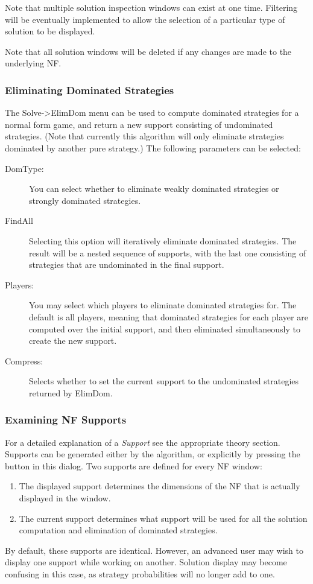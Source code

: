 Note that multiple solution inspection windows can exist at one time.  Filtering will
be eventually implemented to allow the selection of a particular type of solution to
be displayed.

Note that all solution windows will be deleted if any changes are 
made to the underlying NF.



\subsubsection{Eliminating Dominated Strategies}\label{ElimDom}
The Solve->ElimDom menu can be used to compute dominated 
strategies for a normal form game, and return a new support 
consisting of undominated strategies.  
(Note that currently this algorithm will only eliminate 
strategies dominated by another pure strategy.)  The following parameters can 
be selected:
\begin{description}
\item[DomType:]  You can select whether to eliminate weakly dominated 
strategies or strongly dominated strategies.
\item[FindAll] Selecting this option will iteratively eliminate dominated strategies. The 
result will be a nested sequence of supports, with the last one consisting of 
strategies that are undominated in the final support.  
\item[Players:] You may select which players to eliminate dominated strategies for. The 
default is all players, meaning that dominated strategies for each player are computed 
over the initial support, and then eliminated simultaneously to create the new support.  
\item[Compress:] Selects whether to set the current support to the undominated 
strategies returned by ElimDom.  
\end{description}

\subsubsection{Examining NF Supports}\label{ElimDomInspect}
For a detailed explanation of a {\em Support} see the appropriate theory section.
Supports can be generated either by the 
  algorithm, 
or explicitly by pressing the  button 
in this dialog.  Two supports are defined for every NF window:
\begin{enumerate}
\item The displayed support determines the dimensions of the NF that is actually
displayed in the window.
\item The current support determines what support will be used for all the solution
computation and elimination of dominated strategies. 
\end{enumerate}
By default, these supports are identical.  However, an advanced user may wish to
display one support while working on another.  Solution display may become 
confusing in this case, as strategy probabilities will no longer add to one.  

